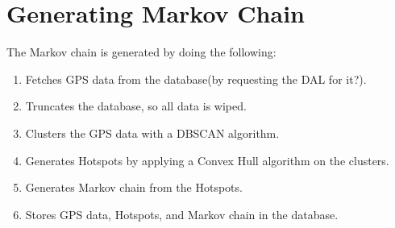 \section{Generating Markov Chain}
The Markov chain is generated by doing the following:

\begin{enumerate}
\item Fetches GPS data from the database(by requesting the DAL for it?).
\item Truncates the database, so all data is wiped.
\item Clusters the GPS data with a DBSCAN algorithm.
\item Generates Hotspots by applying a Convex Hull\cite[page 1031]{aadbook} algorithm on the clusters.
\item Generates Markov chain from the Hotspots.
\item Stores GPS data, Hotspots, and Markov chain in the database.
\end{enumerate}
